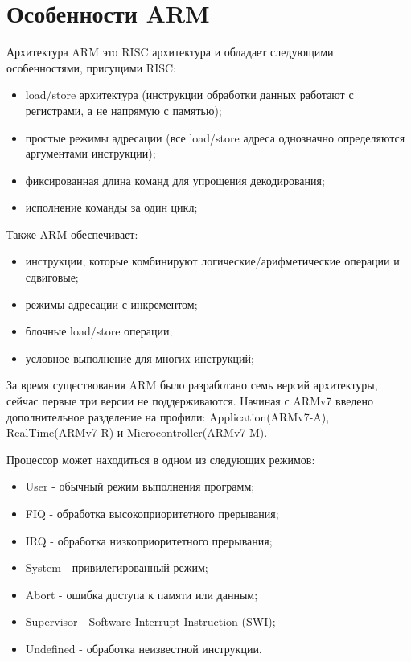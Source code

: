 \section{Особенности ARM}
Архитектура ARM это RISC архитектура и обладает следующими особенностями, присущими RISC\cite{arm_arch_manual}:

\begin{itemize}
    \item load/store архитектура (инструкции обработки данных работают с регистрами, а не напрямую с памятью);
    \item простые режимы адресации (все load/store адреса однозначно определяются аргументами инструкции);
    \item фиксированная длина команд для упрощения декодирования;
    \item исполнение команды за один цикл;
\end{itemize}

Также ARM обеспечивает:

\begin{itemize}
    \item инструкции, которые комбинируют логические/арифметические операции и сдвиговые;
    \item режимы адресации с инкрементом;
    \item блочные load/store операции;
    \item условное выполнение для многих инструкций;
\end{itemize}

За время существования ARM было разработано семь версий архитектуры, сейчас первые три версии не поддерживаются. Начиная с ARMv7 введено дополнительное разделение на профили: Application(ARMv7-A), RealTime(ARMv7-R) и Microcontroller(ARMv7-M).

Процессор может находиться в одном из следующих режимов:
\begin{itemize}
    \item User - обычный режим выполнения программ;
    \item FIQ - обработка высокоприоритетного прерывания;
    \item IRQ - обработка низкоприоритетного прерывания;
    \item System - привилегированный режим;
    \item Abort - ошибка доступа к памяти или данным;
    \item Supervisor - Software Interrupt Instruction (SWI);
    \item Undefined - обработка неизвестной инструкции.
\end{itemize}

